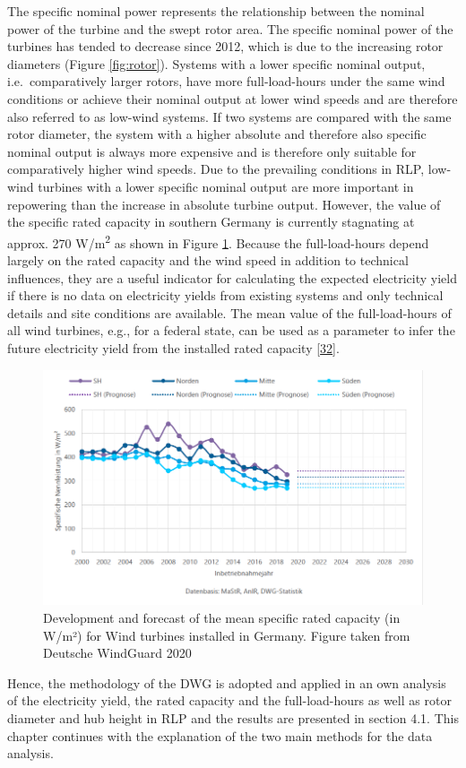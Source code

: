 \documentclass[a4paper,11pt]{article}
\begin{document}
The specific nominal power represents the relationship between the nominal power of the turbine and the swept rotor area. The specific nominal power of the turbines has tended to decrease since 2012, which is due to the increasing rotor diameters (Figure \ref{fig:rotor}). Systems with a lower specific nominal output, i.e.~comparatively larger rotors, have more full-load-hours under the same wind conditions or achieve their nominal output at lower wind speeds and are therefore also referred to as low-wind systems. If two systems are compared with the same rotor diameter, the system with a higher absolute and therefore also specific nominal output is always more expensive and is therefore only suitable for comparatively higher wind speeds. Due to the prevailing conditions in RLP, low-wind turbines with a lower specific nominal output are more important in repowering than the increase in absolute turbine output. However, the value of the specific rated capacity in southern Germany is currently stagnating at approx. 270 W/m\textsuperscript{2} as shown in Figure \ref{fig:spec}. Because the full-load-hours depend largely on the rated capacity and the wind speed in addition to technical influences, they are a useful indicator for calculating the expected electricity yield if there is no data on electricity yields from existing systems and only technical details and site conditions are available. The mean value of the full-load-hours of all wind turbines, e.g., for a federal state, can be used as a parameter to infer the future electricity yield from the installed rated capacity {[}\protect\hyperlink{ref-RasmusBorrmannDr.KnudRehfeldtDr.DennisKruse.2020}{32}{]}.
\begin{figure}[H]

{\centering \includegraphics[width=1\linewidth]{figures/DWG/DWG_Spezifische_Nennleistung} 

}

\caption{Development and forecast of the mean specific rated capacity (in W/m²) for Wind turbines installed in Germany. Figure taken from Deutsche WindGuard 2020}\label{fig:spec}
\end{figure}
Hence, the methodology of the DWG is adopted and applied in an own analysis of the electricity yield, the rated capacity and the full-load-hours as well as rotor diameter and hub height in RLP and the results are presented in section 4.1. This chapter continues with the explanation of the two main methods for the data analysis.
\end{document}
